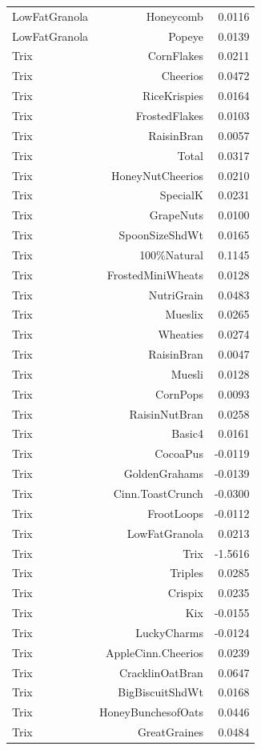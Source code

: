 \begin{longtable}{@{}lrr@{}}
LowFatGranola & Honeycomb & 0.0116 \\
LowFatGranola & Popeye & 0.0139 \\
Trix & CornFlakes & 0.0211 \\
Trix & Cheerios & 0.0472 \\
Trix & RiceKrispies & 0.0164 \\
Trix & FrostedFlakes & 0.0103 \\
Trix & RaisinBran & 0.0057 \\
Trix & Total & 0.0317 \\
Trix & HoneyNutCheerios & 0.0210 \\
Trix & SpecialK & 0.0231 \\
Trix & GrapeNuts & 0.0100 \\
Trix & SpoonSizeShdWt & 0.0165 \\
Trix & 100\%Natural & 0.1145 \\
Trix & FrostedMiniWheats & 0.0128 \\
Trix & NutriGrain & 0.0483 \\
Trix & Mueslix & 0.0265 \\
Trix & Wheaties & 0.0274 \\
Trix & RaisinBran & 0.0047 \\
Trix & Muesli & 0.0128 \\
Trix & CornPops & 0.0093 \\
Trix & RaisinNutBran & 0.0258 \\
Trix & Basic4 & 0.0161 \\
Trix & CocoaPus & -0.0119 \\
Trix & GoldenGrahams & -0.0139 \\
Trix & Cinn.ToastCrunch & -0.0300 \\
Trix & FrootLoops & -0.0112 \\
Trix & LowFatGranola & 0.0213 \\
Trix & Trix & -1.5616 \\
Trix & Triples & 0.0285 \\
Trix & Crispix & 0.0235 \\
Trix & Kix & -0.0155 \\
Trix & LuckyCharms & -0.0124 \\
Trix & AppleCinn.Cheerios & 0.0239 \\
Trix & CracklinOatBran & 0.0647 \\
Trix & BigBiscuitShdWt & 0.0168 \\
Trix & HoneyBunchesofOats & 0.0446 \\
Trix & GreatGraines & 0.0484 \\

\end{longtable}
